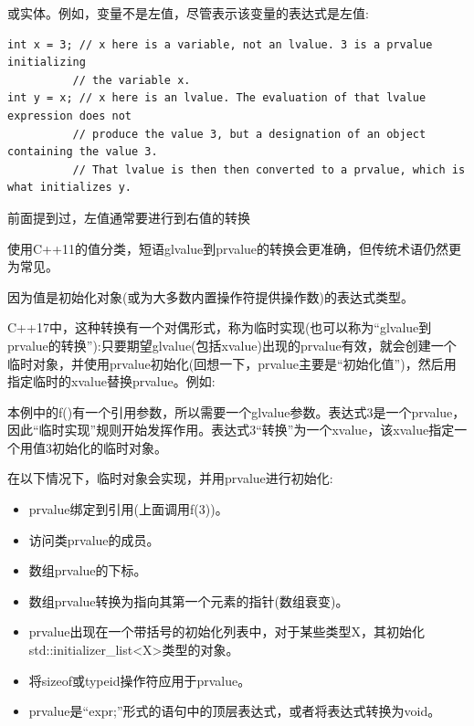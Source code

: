 或实体。例如，变量不是左值，尽管表示该变量的表达式是左值:

\begin{lstlisting}[style=styleCXX]
int x = 3; // x here is a variable, not an lvalue. 3 is a prvalue initializing
		  // the variable x.
int y = x; // x here is an lvalue. The evaluation of that lvalue expression does not
		  // produce the value 3, but a designation of an object containing the value 3.
		  // That lvalue is then then converted to a prvalue, which is what initializes y.
\end{lstlisting}


前面提到过，左值通常要进行到右值的转换

\begin{tcolorbox}[colback=webgreen!5!white,colframe=webgreen!75!black]
\hspace*{0.75cm}使用C++11的值分类，短语glvalue到prvalue的转换会更准确，但传统术语仍然更为常见。
\end{tcolorbox}

因为值是初始化对象(或为大多数内置操作符提供操作数)的表达式类型。

C++17中，这种转换有一个对偶形式，称为临时实现(也可以称为“glvalue到prvalue的转换”):只要期望glvalue(包括xvalue)出现的prvalue有效，就会创建一个临时对象，并使用prvalue初始化(回想一下，prvalue主要是“初始化值”)，然后用指定临时的xvalue替换prvalue。例如:

本例中的f()有一个引用参数，所以需要一个glvalue参数。表达式3是一个prvalue，因此“临时实现”规则开始发挥作用。表达式3“转换”为一个xvalue，该xvalue指定一个用值3初始化的临时对象。

在以下情况下，临时对象会实现，并用prvalue进行初始化:

\begin{itemize}
\item 
prvalue绑定到引用(上面调用f(3))。

\item 
访问类prvalue的成员。

\item 
数组prvalue的下标。

\item 
数组prvalue转换为指向其第一个元素的指针(数组衰变)。

\item 
prvalue出现在一个带括号的初始化列表中，对于某些类型X，其初始化std::initializer\_list<X>类型的对象。

\item 
将sizeof或typeid操作符应用于prvalue。

\item 
prvalue是“expr;”形式的语句中的顶层表达式，或者将表达式转换为void。
\end{itemize}

